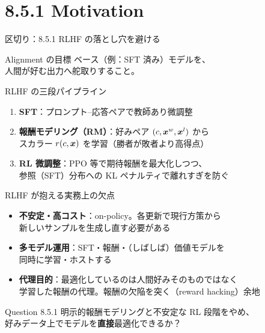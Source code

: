 \section{8.5.1 Motivation}
\asmain
\begin{frame}{区切り：8.5.1 RLHF の落とし穴を避ける}
    \tableofcontents[currentsection]
\end{frame}
\asmain
\begin{frame}{Alignment の目標}
    ベース（例：SFT 済み）モデルを、\\
    人間が好む出力へ舵取りすること。
    \begin{block}{RLHF の三段パイプライン}
        \begin{enumerate}
            \item \textbf{SFT}：プロンプト--応答ペアで教師あり微調整
            \item \textbf{報酬モデリング（RM）}：好みペア $(c,\bm{x}^w,\bm{x}^l)$ から\\
            スカラー $r(c,\bm{x})$ を学習（勝者が敗者より高得点）
            \item \textbf{RL 微調整}：PPO 等で期待報酬を最大化しつつ、\\
            参照（SFT）分布への KL ペナルティで離れすぎを防ぐ
        \end{enumerate}
    \end{block}
\end{frame}
\asmain
\begin{frame}{RLHF が抱える実務上の欠点}
    \begin{itemize}
        \item \textbf{不安定・高コスト}：on-policy。各更新で現行方策から\\
        新しいサンプルを生成し直す必要がある
        \item \textbf{多モデル運用}：SFT・報酬・（しばしば）価値モデルを\\
        同時に学習・ホストする
        \item \textbf{代理目的}：最適化しているのは人間好みそのものではなく\\
        学習した報酬の代理。報酬の欠陥を突く（reward hacking）余地
    \end{itemize}
    \begin{alertblock}{Question 8.5.1}
        明示的報酬モデリングと不安定な RL 段階をやめ、\\
        好みデータ上でモデルを\textbf{直接}最適化できるか？
    \end{alertblock}
\end{frame}
